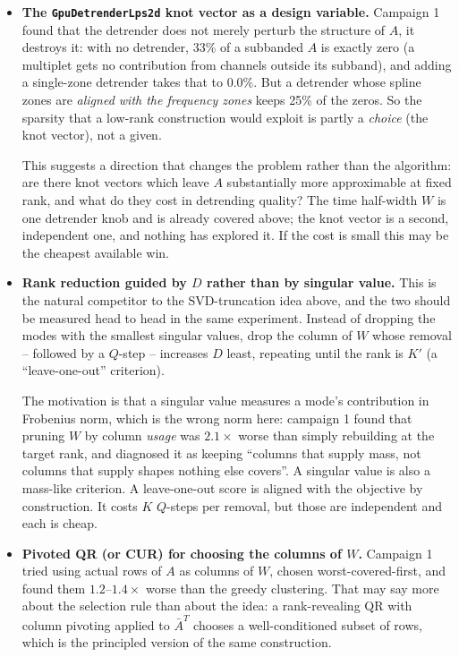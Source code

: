 \documentclass{article}
\numberwithin{equation}{section}   %
\begin{document}
\begin{itemize}

\item {\bf The {\tt GpuDetrenderLps2d} knot vector as a design variable.}
 Campaign 1 found that the detrender does not merely perturb the structure of $A$, it
 destroys it: with no detrender, 33\% of a subbanded $A$ is exactly zero (a multiplet gets
 no contribution from channels outside its subband), and adding a single-zone detrender
 takes that to 0.0\%. But a detrender whose spline zones are {\em aligned with the frequency
 zones} keeps 25\% of the zeros. So the sparsity that a low-rank construction would exploit
 is partly a {\em choice} (the knot vector), not a given.

 This suggests a direction that changes the problem rather than the algorithm: are there
 knot vectors which leave $A$ substantially more approximable at fixed rank, and what do
 they cost in detrending quality? The time half-width $W$ is one detrender knob and is
 already covered above; the knot vector is a second, independent one, and nothing has
 explored it. If the cost is small this may be the cheapest available win.

\item {\bf Rank reduction guided by $D$ rather than by singular value.}
 This is the natural competitor to the SVD-truncation idea above, and the two should be
 measured head to head in the same experiment. Instead of dropping the modes with the
 smallest singular values, drop the column of $W$ whose removal -- followed by a $Q$-step --
 increases $D$ least, repeating until the rank is $K'$ (a ``leave-one-out'' criterion).

 The motivation is that a singular value measures a mode's contribution in Frobenius norm,
 which is the wrong norm here: campaign 1 found that pruning $W$ by column {\em
 usage} was $2.1\times$ worse than simply rebuilding at the target rank, and diagnosed it as
 keeping ``columns that supply mass, not columns that supply shapes nothing else covers''.
 A singular value is also a mass-like criterion. A leave-one-out score is aligned with the
 objective by construction. It costs $K$ $Q$-steps per removal, but those are independent
 and each is cheap.

\item {\bf Pivoted QR (or CUR) for choosing the columns of $W$.}
 Campaign 1 tried using actual rows of $A$ as columns of $W$, chosen worst-covered-first,
 and found them $1.2$--$1.4\times$ worse than the greedy clustering. That may say more about
 the selection rule than about the idea: a rank-revealing QR with column pivoting applied to
 $\bar A^T$ chooses a well-conditioned subset of rows, which is the principled version of
 the same construction.


\end{itemize}
\end{document}

